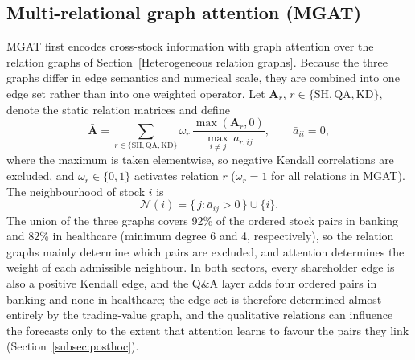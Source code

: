 \subsection{Multi-relational graph attention (MGAT)}\label{subsec3}

{\color{blue}MGAT first encodes cross-stock information with graph attention \citep{Velickovic2018GAT} over the relation graphs of Section~\ref{Heterogeneous relation graphs}. Because the three graphs differ in edge semantics and numerical scale, they are combined into one edge set rather than into one weighted operator. Let $\mathbf{A}_r$, $r\in\{\mathrm{SH},\mathrm{QA},\mathrm{KD}\}$, denote the static relation matrices and define
\begin{equation}
\bar{\mathbf{A}}=\sum_{r\in\{\mathrm{SH},\mathrm{QA},\mathrm{KD}\}}\omega_r\,\frac{\max(\mathbf{A}_r,0)}{\max_{i\neq j}\,a_{r,ij}},\qquad \bar a_{ii}=0,
\label{eq:Afused_re}
\end{equation}
where the maximum is taken elementwise, so negative Kendall correlations are excluded, and $\omega_r\in\{0,1\}$ activates relation $r$ ($\omega_r=1$ for all relations in MGAT). The neighbourhood of stock $i$ is
\begin{equation}
\mathcal{N}(i)=\{\,j:\bar a_{ij}>0\,\}\cup\{i\}.
\label{eq:neigh}
\end{equation}
The union of the three graphs covers 92\% of the ordered stock pairs in banking and 82\% in healthcare (minimum degree 6 and 4, respectively), so the relation graphs mainly determine which pairs are excluded, and attention determines the weight of each admissible neighbour. In both sectors, every shareholder edge is also a positive Kendall edge, and the Q\&A layer adds four ordered pairs in banking and none in healthcare; the edge set is therefore determined almost entirely by the trading-value graph, and the qualitative relations can influence the forecasts only to the extent that attention learns to favour the pairs they link (Section~\ref{subsec:posthoc}).

}
